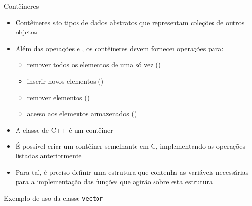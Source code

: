 \begin{frame}[fragile]{Contêineres}

	\begin{itemize}

		\item Contêineres são tipos de dados abstratos que representam coleções de outros objetos

		\item Além das operações  e , os contêineres devem fornecer 
        operações para:
		\begin{itemize}
			\item remover todos os elementos de uma só vez ()
			\item inserir novos elementos ()
			\item remover elementos ()
			\item acesso aos elementos armazenados ()
		\end{itemize}

		\item A classe  de C++ é um contêiner

		\item É possível criar um contêiner semelhante em C, implementando as operações listadas 
		anteriormente

		\item Para tal, é preciso definir uma estrutura que contenha as variáveis necessárias para 
        a implementação das funções que agirão sobre esta estrutura
	\end{itemize}

\end{frame}

\begin{frame}[fragile]{Exemplo de uso da classe \texttt{vector}}
\end{frame}
